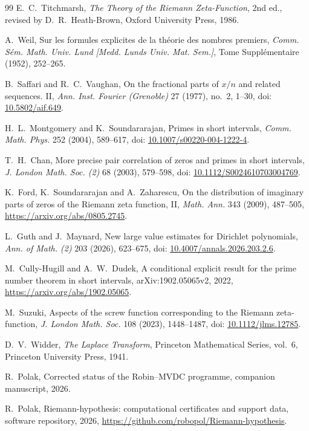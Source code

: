 \documentclass[11pt,a4paper]{article}
\numberwithin{equation}{section}
\theoremstyle{definition}
\begin{document}
\begin{thebibliography}{99}
E.~C.~Titchmarsh,
\newblock \emph{The Theory of the Riemann Zeta-Function},
\newblock 2nd ed., revised by D.~R.~Heath-Brown,
\newblock Oxford University Press, 1986.

A.~Weil,
\newblock Sur les formules explicites de la th\'eorie des nombres premiers,
\newblock \emph{Comm. S\'em. Math. Univ. Lund
[Medd. Lunds Univ. Mat. Sem.]}, Tome Suppl\'ementaire (1952), 252--265.

B.~Saffari and R.~C.~Vaughan,
\newblock On the fractional parts of \(x/n\) and related sequences. II,
\newblock \emph{Ann. Inst. Fourier (Grenoble)} 27 (1977), no.~2, 1--30,
\newblock doi:
\href{https://doi.org/10.5802/aif.649}{10.5802/aif.649}.

H.~L.~Montgomery and K.~Soundararajan,
\newblock Primes in short intervals,
\newblock \emph{Comm. Math. Phys.} 252 (2004), 589--617,
\newblock doi:
\href{https://doi.org/10.1007/s00220-004-1222-4}
{10.1007/s00220-004-1222-4}.

T.~H.~Chan,
\newblock More precise pair correlation of zeros and primes in short
intervals,
\newblock \emph{J. London Math. Soc. (2)} 68 (2003), 579--598,
\newblock doi:
\href{https://doi.org/10.1112/S0024610703004769}
{10.1112/S0024610703004769}.

K.~Ford, K.~Soundararajan and A.~Zaharescu,
\newblock On the distribution of imaginary parts of zeros of the Riemann
zeta function, II,
\newblock \emph{Math. Ann.} 343 (2009), 487--505,
\newblock \url{https://arxiv.org/abs/0805.2745}.

L.~Guth and J.~Maynard,
\newblock New large value estimates for Dirichlet polynomials,
\newblock \emph{Ann. of Math. (2)} 203 (2026), 623--675,
\newblock doi:
\href{https://doi.org/10.4007/annals.2026.203.2.6}
{10.4007/annals.2026.203.2.6}.

M.~Cully-Hugill and A.~W.~Dudek,
\newblock A conditional explicit result for the prime number theorem in
short intervals,
\newblock arXiv:1902.05065v2, 2022,
\newblock \url{https://arxiv.org/abs/1902.05065}.

M.~Suzuki,
\newblock Aspects of the screw function corresponding to the Riemann
zeta-function,
\newblock \emph{J. London Math. Soc.} 108 (2023), 1448--1487,
\newblock doi:
\href{https://doi.org/10.1112/jlms.12785}{10.1112/jlms.12785}.

D.~V.~Widder,
\newblock \emph{The Laplace Transform},
\newblock Princeton Mathematical Series, vol.~6,
\newblock Princeton University Press, 1941.

R.~Polak,
\newblock Corrected status of the Robin--MVDC programme,
\newblock companion manuscript, 2026.

R.~Polak,
\newblock Riemann-hypothesis: computational certificates and support data,
\newblock software repository, 2026,
\newblock \url{https://github.com/robopol/Riemann-hypothesis}.

\end{thebibliography}
\end{document}
